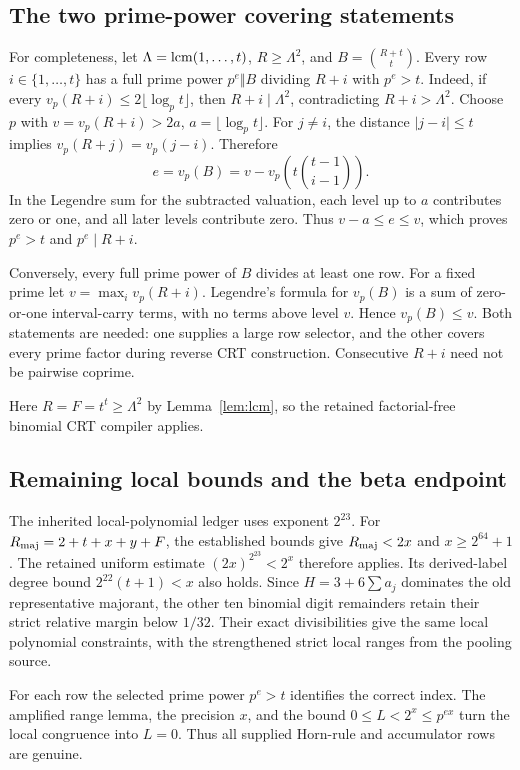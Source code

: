 \documentclass[11pt]{article}
\theoremstyle{remark}\newtheorem{remark}[theorem]{Remark}
\begin{document}
\subsection{The two prime-power covering statements}

For completeness, let $\Lambda=\operatorname{lcm}(1,\ldots,t)$, $R\ge\Lambda^2$,
and $B=\binom{R+t}{t}$. Every row $i\in\{1,\ldots,t\}$ has a full
prime power $p^e\Vert B$ dividing $R+i$ with $p^e>t$.
Indeed, if every $v_p(R+i)\le2\lfloor\log_p t\rfloor$, then
$R+i\mid\Lambda^2$, contradicting $R+i>\Lambda^2$.
Choose $p$ with $v=v_p(R+i)>2a$, $a=\lfloor\log_p t\rfloor$.
For $j\ne i$, the distance $|j-i|\le t$ implies
$v_p(R+j)=v_p(j-i)$. Therefore
\[
 e=v_p(B)=v-v_p\!\left(t\binom{t-1}{i-1}\right).
\]
In the Legendre sum for the subtracted valuation, each level up to $a$
contributes zero or one, and all later levels contribute zero.
Thus $v-a\le e\le v$, which proves $p^e>t$ and $p^e\mid R+i$.

Conversely, every full prime power of $B$ divides at least one row.
For a fixed prime let $v=\max_i v_p(R+i)$. Legendre's formula for
$v_p(B)$ is a sum of zero-or-one interval-carry terms, with no terms
above level $v$. Hence $v_p(B)\le v$. Both statements are needed:
one supplies a large row selector, and the other covers every prime
factor during reverse CRT construction. Consecutive $R+i$ need not
be pairwise coprime.

Here $R=F=t^t\ge\Lambda^2$ by Lemma~\ref{lem:lcm}, so the
retained factorial-free binomial CRT compiler applies.

\subsection{Remaining local bounds and the beta endpoint}

The inherited local-polynomial ledger uses exponent $2^{23}$.
For $R_{\rm maj}=2+t+x+y+F$, the established bounds give
$R_{\rm maj}<2x$ and $x\ge2^{64}+1$. The retained uniform estimate
$(2x)^{2^{23}}<2^x$ therefore applies. Its derived-label degree
bound $2^{22}(t+1)<x$ also holds. Since $H=3+6\sum a_j$ dominates
the old representative majorant, the other ten binomial digit
remainders retain their strict relative margin below $1/32$.
Their exact divisibilities give the same local polynomial constraints,
with the strengthened strict local ranges from the pooling source.

For each row the selected prime power $p^e>t$ identifies the correct
index. The amplified range lemma, the precision $x$, and the bound
$0\le L<2^x\le p^{ex}$ turn the local congruence into $L=0$.
Thus all supplied Horn-rule and accumulator rows are genuine.
\end{document}

